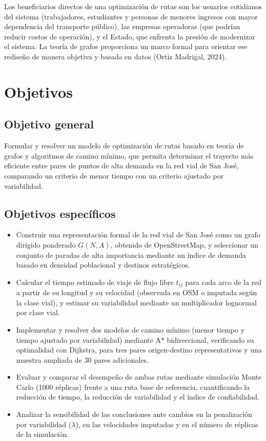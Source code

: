\documentclass[11pt]{article}
\numberwithin{equation}{section}
\begin{document}
Los beneficiarios directos de una optimización de rutas son los usuarios cotidianos del sistema (trabajadores, estudiantes y personas de menores ingresos con mayor dependencia del transporte público), las empresas operadoras (que podrían reducir costos de operación), y el Estado, que enfrenta la presión de modernizar el sistema. La teoría de grafos proporciona un marco formal para orientar ese rediseño de manera objetiva y basada en datos (Ortiz Madrigal, 2024).

\section{Objetivos}\label{sec:objetivos}

\subsection{Objetivo general}

Formular y resolver un modelo de optimización de rutas basado en teoría de grafos y algoritmos de camino mínimo, que permita determinar el trayecto más eficiente entre pares de puntos de alta demanda en la red vial de San José, comparando un criterio de menor tiempo con un criterio ajustado por variabilidad.

\subsection{Objetivos específicos}

\begin{itemize}
    \item Construir una representación formal de la red vial de San José como un grafo dirigido ponderado $G(N, A)$, obtenido de OpenStreetMap, y seleccionar un conjunto de paradas de alta importancia mediante un índice de demanda basado en densidad poblacional y destinos estratégicos.
    \item Calcular el tiempo estimado de viaje de flujo libre $t_{ij}$ para cada arco de la red a partir de su longitud y su velocidad (observada en OSM o imputada según la clase vial), y estimar su variabilidad mediante un multiplicador lognormal por clase vial.
    \item Implementar y resolver dos modelos de camino mínimo (menor tiempo y tiempo ajustado por variabilidad) mediante A* bidireccional, verificando su optimalidad con Dijkstra, para tres pares origen-destino representativos y una muestra ampliada de 30 pares adicionales.
    \item Evaluar y comparar el desempeño de ambas rutas mediante simulación Monte Carlo (1000 réplicas) frente a una ruta base de referencia, cuantificando la reducción de tiempo, la reducción de variabilidad y el índice de confiabilidad.
    \item Analizar la sensibilidad de las conclusiones ante cambios en la penalización por variabilidad ($\lambda$), en las velocidades imputadas y en el número de réplicas de la simulación.
\end{itemize}
\end{document}
